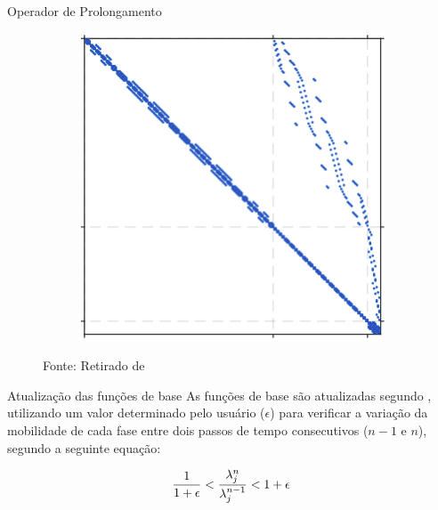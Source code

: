 \documentclass[professionalfont]{beamer}
\begin{document}
\begin{frame}{Operador de Prolongamento}
\begin{figure}[!ht]
\begin{subfigure}{.3\textwidth}
            \subcaption{\finewirebasketMatrix}
            \label{fig:multiescala.4.b}
        \end{subfigure}
        \begin{subfigure}{.3\textwidth}
            \centering
            \includegraphics[scale=0.27]{./imgs/im12.png}
            \subcaption{$\finewirebasketMatrixMod$}
            \label{fig:multiescala.4.c}
        \end{subfigure}
        
        {\footnotesize Fonte: Retirado de \cite{Magri2015}}
        \label{fig:multiescala.4}
    \end{figure}

\end{frame}

\begin{frame}{Atualização das funções de base}
    As funções de base são atualizadas segundo , utilizando um valor determinado pelo usuário ($\epsilon$) para verificar a variação da mobilidade de cada fase entre dois passos de tempo consecutivos ($n-1$ e $n$), segundo a seguinte equação:

\begin{equation}
    \dfrac{1}{1+\epsilon} < \dfrac{\lambda_{j}^{n}}{\lambda_{j}^{n-1}}  < 1 + \epsilon  
    \label{eq:update_bf.1}
\end{equation}
\end{frame}
\end{document}
